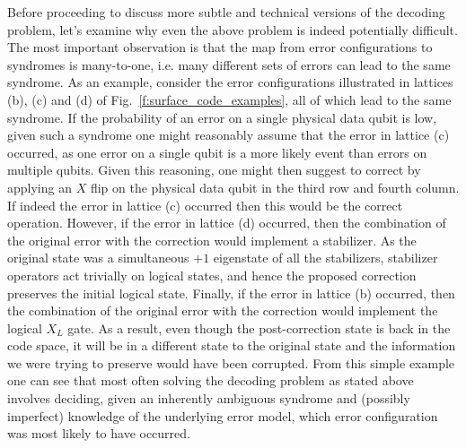 \documentclass[twocolumn,preprintnumbers,amsmath,amssymb,notitlepage,nofootinbib,longbibliography,superscriptaddress,aps,pra,10pt]{revtex4-1}
\begin{document}
	\noindent Before proceeding to discuss more subtle and technical versions of the decoding problem, let's examine why even the above problem is indeed potentially difficult.
	The most important observation is that the map from error configurations to syndromes is many-to-one, i.e. many different sets of errors can lead to the same syndrome.
	As an example, consider the error configurations illustrated in lattices (b), (c) and (d) of Fig.~\ref{f:surface_code_examples}, all of which lead to the same syndrome.
	If the probability of an error on a single physical data qubit is low, given such a syndrome one might reasonably assume that the error in lattice (c) occurred, as one error on a single qubit is a more likely event than errors on multiple qubits.
	Given this reasoning, one might then suggest to correct by applying an $X$ flip on the physical data qubit in the third row and fourth column.
	If indeed the error in lattice (c) occurred then this would be the correct operation.
	However, if the error in lattice (d) occurred, then the combination of the original error with the correction would implement a stabilizer.
	As the original state was a simultaneous $+1$ eigenstate of all the stabilizers, stabilizer operators act trivially on logical states, and hence the proposed correction preserves the initial logical state.
	Finally, if the error in lattice (b) occurred, then the combination of the original error with the correction would implement the logical $X_L$ gate.
	As a result, even though the post-correction state is back in the code space, it will be in a different state to the original state and the information we were trying to preserve would have been corrupted.
	From this simple example one can see that most often solving the decoding problem as stated above involves deciding, given an inherently ambiguous syndrome and (possibly imperfect) knowledge of the underlying error model, which error configuration was most likely to have occurred.
\end{document}

